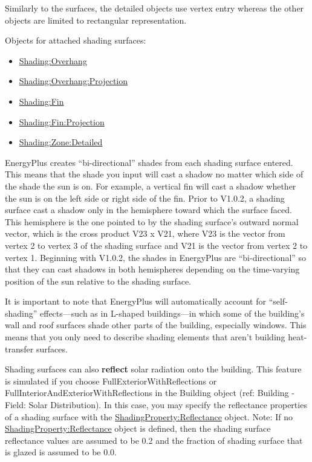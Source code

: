 Similarly to the surfaces, the detailed objects use vertex entry whereas the other objects are limited to rectangular representation.

Objects for attached shading surfaces:

\begin{itemize}
\item
  \hyperref[shadingoverhang]{Shading:Overhang}
\item
  \hyperref[shadingoverhangprojection]{Shading:Overhang:Projection}
\item
  \hyperref[shadingfin]{Shading:Fin}
\item
  \hyperref[shadingfinprojection]{Shading:Fin:Projection}
\item
  \hyperref[shadingzonedetailed-000]{Shading:Zone:Detailed}
\end{itemize}

EnergyPlus creates ``bi-directional'' shades from each shading surface entered. This means that the shade you input will cast a shadow no matter which side of the shade the sun is on. For example, a vertical fin will cast a shadow whether the sun is on the left side or right side of the fin. Prior to V1.0.2, a shading surface cast a shadow only in the hemisphere toward which the surface faced. This hemisphere is the one pointed to by the shading surface's outward normal vector, which is the cross product V23 x V21, where V23 is the vector from vertex 2 to vertex 3 of the shading surface and V21 is the vector from vertex 2 to vertex 1. Beginning with V1.0.2, the shades in EnergyPlus are ``bi-directional'' so that they can cast shadows in both hemispheres depending on the time-varying position of the sun relative to the shading surface.

It is important to note that EnergyPlus will automatically account for ``self-shading'' effects---such as in L-shaped buildings---in which some of the building's wall and roof surfaces shade other parts of the building, especially windows. This means that you only need to describe shading elements that aren't building heat-transfer surfaces.

Shading surfaces can also \textbf{reflect} solar radiation onto the building. This feature is simulated if you choose FullExteriorWithReflections or FullInteriorAndExteriorWithReflections in the Building object (ref: Building - Field: Solar Distribution). In this case, you may specify the reflectance properties of a shading surface with the \hyperref[shadingpropertyreflectance]{ShadingProperty:Reflectance} object. Note: If no \hyperref[shadingpropertyreflectance]{ShadingProperty:Reflectance} object is defined, then the shading surface reflectance values are assumed to be 0.2 and the fraction of shading surface that is glazed is assumed to be 0.0.

